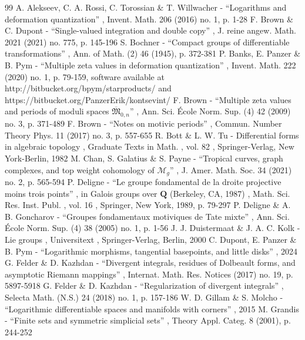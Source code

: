 \begin{thebibliography}{99}
 A. Alekseev, C. A. Rossi, C. Torossian \& T. Willwacher - “Logarithms and deformation quantization” , Invent. Math. 206 (2016) no. 1, p. 1-28
 F. Brown \& C. Dupont - “Single-valued integration and double copy” , J. reine angew. Math. 2021 (2021) no. 775, p. 145-196
 S. Bochner - “Compact groups of differentiable transformations” , Ann. of Math. (2) 46 (1945), p. 372-381
 P. Banks, E. Panzer \& B. Pym - “Multiple zeta values in deformation quantization” , Invent. Math. 222 (2020) no. 1, p. 79-159, software available at http://bitbucket.org/bpym/starproducts/ and https://bitbucket.org/PanzerErik/kontsevint/
 F. Brown - “Multiple zeta values and periods of moduli spaces $\overline{\mathfrak{M}}_{0,n}$” , Ann. Sci. École Norm. Sup. (4) 42 (2009) no. 3, p. 371-489
 F. Brown - “Notes on motivic periods” , Commun. Number Theory Phys. 11 (2017) no. 3, p. 557-655
 R. Bott \& L. W. Tu - Differential forms in algebraic topology , Graduate Texts in Math. , vol. 82 , Springer-Verlag, New York-Berlin, 1982
 M. Chan, S. Galatius \& S. Payne - “Tropical curves, graph complexes, and top weight cohomology of $\mathcal{M}_g$” , J. Amer. Math. Soc. 34 (2021) no. 2, p. 565-594
 P. Deligne - “Le groupe fondamental de la droite projective moins trois points” , in Galois groups over ${\mathbf{Q}}$ (Berkeley, CA, 1987) , Math. Sci. Res. Inst. Publ. , vol. 16 , Springer, New York, 1989, p. 79-297
 P. Deligne \& A. B. Goncharov - “Groupes fondamentaux motiviques de Tate mixte” , Ann. Sci. École Norm. Sup. (4) 38 (2005) no. 1, p. 1-56
 J. J. Duistermaat \& J. A. C. Kolk - Lie groups , Universitext , Springer-Verlag, Berlin, 2000
 C. Dupont, E. Panzer \& B. Pym - “Logarithmic morphisms, tangential basepoints, and little disks” , 2024
 G. Felder \& D. Kazhdan - “Divergent integrals, residues of Dolbeault forms, and asymptotic Riemann mappings” , Internat. Math. Res. Notices (2017) no. 19, p. 5897-5918
 G. Felder \& D. Kazhdan - “Regularization of divergent integrals” , Selecta Math. (N.S.) 24 (2018) no. 1, p. 157-186
 W. D. Gillam \& S. Molcho - “Logarithmic differentiable spaces and manifolds with corners” , 2015
 M. Grandis - “Finite sets and symmetric simplicial sets” , Theory Appl. Categ. 8 (2001), p. 244-252

\end{thebibliography}
